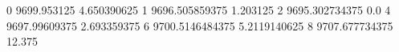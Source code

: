 0 9699.953125 4.650390625
1 9696.505859375 1.203125
2 9695.302734375 0.0
4 9697.99609375 2.693359375
6 9700.5146484375 5.2119140625
8 9707.677734375 12.375
